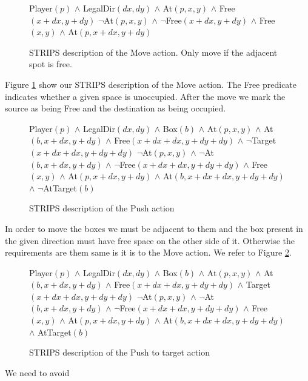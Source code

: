 \begin{figure}[!h]
  \centering {}%
  {Player$(p)$ $\wedge$ LegalDir$(dx, dy)$ $\wedge$ At$(p, x, y)$
    $\wedge$ Free$(x+dx, y+dy)$}%
  {$\neg$At$(p, x, y)$ $\wedge$ $\neg$Free$(x+dx, y+dy)$ $\wedge$
    Free$(x, y)$ $\wedge$ At$(p, x+dx, y+dy)$}
  \caption{STRIPS description of the Move action. Only move if the
    adjacent spot is free.}
  \label{fig:strips-move}
\end{figure}


Figure \ref{fig:strips-move} show our STRIPS description of the Move
action. The Free predicate indicates whether a given space is
unoccupied. After the move we mark the source as being Free and the
destination as being occupied.

\begin{figure}[!h]
  \centering {}%
  {Player$(p)$ $\wedge$ LegalDir$(dx, dy)$ $\wedge$ Box$(b)$ $\wedge$
    At$(p, x, y)$ $\wedge$ At$(b, x+dx, y+dy)$ $\wedge$ Free$(x+dx+dx,
    y+dy+dy)$ $\wedge$ $\neg$Target$(x+dx+dx, y+dy+dy)$}%
  {$\neg$At$(p, x, y)$ $\wedge$ $\neg$At$(b, x+dx, y+dy)$ $\wedge$
    $\neg$Free$(x+dx+dx, y+dy+dy)$ $\wedge$ Free$(x, y)$ $\wedge$
    At$(p, x+dx, y+dy)$ $\wedge$ At$(b, x+dx+dx, y+dy+dy)$ $\wedge$
    $\neg$AtTarget$(b)$}
  \caption{STRIPS description of the Push action}
  \label{fig:strips-push}
\end{figure}

In order to move the boxes we must be adjacent to them and the box
present in the given direction must have free space on the other side
of it. Otherwise the requirements are them same is it is to the Move
action. We refer to Figure \ref{fig:strips-push}.

\begin{figure}[!h]
  \centering {}%
  {Player$(p)$ $\wedge$ LegalDir$(dx, dy)$ $\wedge$ Box$(b)$ $\wedge$
    At$(p, x, y)$ $\wedge$ At$(b, x+dx, y+dy)$ $\wedge$ Free$(x+dx+dx,
    y+dy+dy)$ $\wedge$ Target$(x+dx+dx, y+dy+dy)$}%
  {$\neg$At$(p, x, y)$ $\wedge$ $\neg$At$(b, x+dx, y+dy)$ $\wedge$
    $\neg$Free$(x+dx+dx, y+dy+dy)$ $\wedge$ Free$(x, y)$ $\wedge$
    At$(p, x+dx, y+dy)$ $\wedge$ At$(b, x+dx+dx, y+dy+dy)$ $\wedge$
    AtTarget$(b)$}
  \caption{STRIPS description of the Push to target action}
  \label{fig:strips-pushtotarget}
\end{figure}

We need to avoid 


